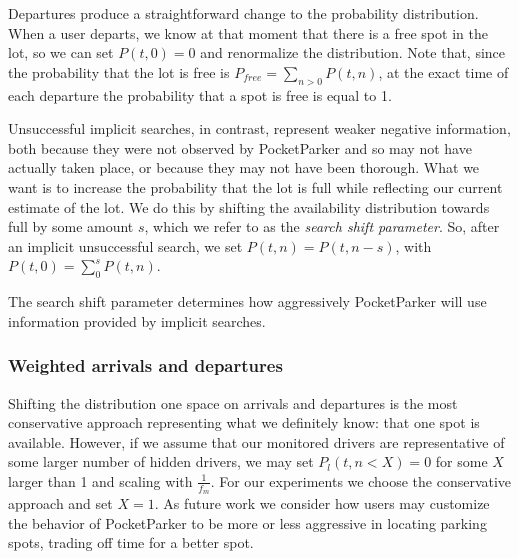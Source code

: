 Departures produce a straightforward change to the probability distribution.
When a user departs, we know at that moment that there is a free spot in the
lot, so we can set $P(t, 0) = 0$ and renormalize the distribution. Note that,
since the probability that the lot is free is $P_{free} = \sum_{n > 0} P(t,
n)$, at the exact time of each departure the probability that a spot is free
is equal to 1. 

Unsuccessful implicit searches, in contrast, represent weaker negative
information, both because they were not observed by PocketParker and so may
not have actually taken place, or because they may not have been thorough.
What we want is to increase the probability that the lot is full while
reflecting our current estimate of the lot. We do this by shifting the
availability distribution towards full by some amount $s$, which we refer to
as the \textit{search shift parameter}. So, after an implicit unsuccessful
search, we set $P(t, n) = P(t, n - s)$, with $P(t, 0) = \sum_0^s P(t, n)$.

The search shift parameter determines how aggressively PocketParker
will use information provided by implicit searches.

\subsubsection{Weighted arrivals and departures}

Shifting the distribution one space on arrivals and departures is the most
conservative approach representing what we definitely know: that one spot is
available. However, if we assume that our monitored drivers are
representative of some larger number of hidden drivers, we may set $P_l(t, n
< X) = 0$ for some $X$ larger than 1 and scaling with $\frac{1}{f_m}$. For
our experiments we choose the conservative approach and set $X = 1$. As
future work we consider how users may customize the behavior of PocketParker
to be more or less aggressive in locating parking spots, trading off time for
a better spot.
